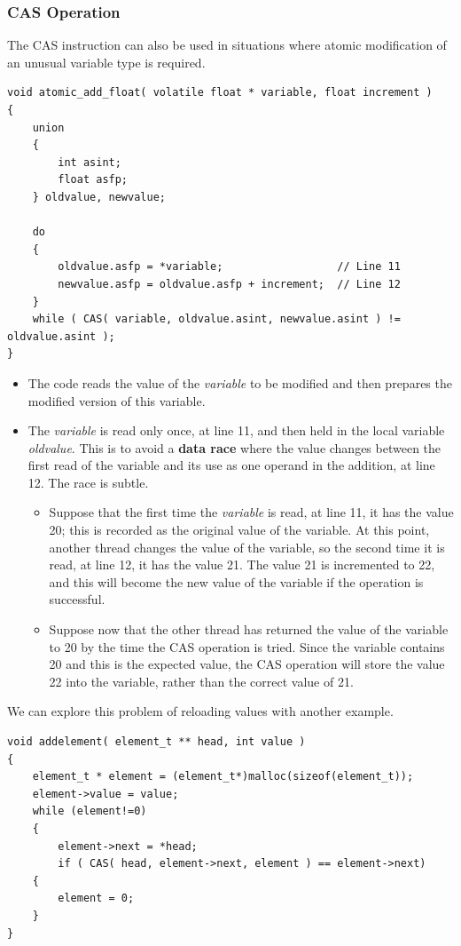 \documentclass[12pt,a4paper]{report}
\begin{document}
\subsubsection*{CAS Operation}
The CAS instruction can also be used in situations where atomic modification of an unusual variable type is required.
\begin{lstlisting}
void atomic_add_float( volatile float * variable, float increment )
{
	union
	{
		int asint;
		float asfp;
	} oldvalue, newvalue;
	
	do
	{
		oldvalue.asfp = *variable;                  // Line 11
		newvalue.asfp = oldvalue.asfp + increment;  // Line 12
	}
	while ( CAS( variable, oldvalue.asint, newvalue.asint ) != oldvalue.asint );
}
\end{lstlisting}
\begin{itemize}
	\item The code reads the value of the \textit{variable} to be modified and then prepares the modified version of this variable. 
	\item The \textit{variable} is read only once, at line 11, and then held in the local variable \textit{oldvalue}. This is to avoid a \textbf{data race} where the value changes between the first read of the variable and its use as one operand in the addition, at line 12. The race is subtle.
	\begin{itemize}
		\item Suppose that the first time the \textit{variable} is read, at line 11, it has the value 20; this is recorded as the original value of the variable. At this point, another thread changes the value of the variable, so the second time it is read, at line 12, it has the value 21. The value 21 is incremented to 22, and this will become the new value of the variable if the operation is successful.
		\item Suppose now that the other thread has returned the value of the variable to 20 by the time the CAS operation is tried. Since the variable contains 20 and this is the expected value, the CAS operation will store the value 22 into the variable, rather than the correct value of 21.
	\end{itemize} 
\end{itemize}
We can explore this problem of reloading values with another example.
\begin{lstlisting}
void addelement( element_t ** head, int value )
{
	element_t * element = (element_t*)malloc(sizeof(element_t));
	element->value = value;
	while (element!=0)
	{
		element->next = *head;
		if ( CAS( head, element->next, element ) == element->next)
	{
		element = 0;
	}
}
\end{lstlisting}
\end{document}
